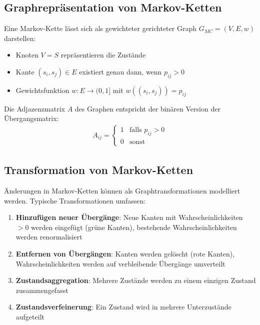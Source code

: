 \documentclass[a4paper,12pt]{article}
\theoremstyle{definition}
\begin{document}
\subsection{Graphrepräsentation von Markov-Ketten}

Eine Markov-Kette lässt sich als gewichteter gerichteter Graph $G_{MC} = (V, E, w)$ darstellen:

\begin{itemize}
	\item[-] Knoten $V = S$ repräsentieren die Zustände
	\item[-] Kante $(s_i, s_j) \in E$ existiert genau dann, wenn $p_{ij} > 0$
	\item[-] Gewichtsfunktion $w: E \rightarrow (0, 1]$ mit $w((s_i, s_j)) = p_{ij}$
\end{itemize}

Die Adjazenzmatrix $A$ des Graphen entspricht der binären Version der Übergangsmatrix:
\begin{align}
	A_{ij} = \begin{cases}
		1 & \text{falls } p_{ij} > 0 \\
		0 & \text{sonst}
	\end{cases}
\end{align}

\subsection{Transformation von Markov-Ketten}

Änderungen in Markov-Ketten können als Graphtransformationen modelliert werden. Typische Transformationen umfassen:

\begin{enumerate}
	\item \textbf{Hinzufügen neuer Übergänge}: Neue Kanten mit Wahrscheinlichkeiten $> 0$ werden eingefügt (grüne Kanten), bestehende Wahrscheinlichkeiten werden renormalisiert
	
	\item \textbf{Entfernen von Übergängen}: Kanten werden gelöscht (rote Kanten), Wahrscheinlichkeiten werden auf verbleibende Übergänge umverteilt
	
	\item \textbf{Zustandsaggregation}: Mehrere Zustände werden zu einem einzigen Zustand zusammengefasst
	
	\item \textbf{Zustandsverfeinerung}: Ein Zustand wird in mehrere Unterzustände aufgeteilt
\end{enumerate}
\end{document}
